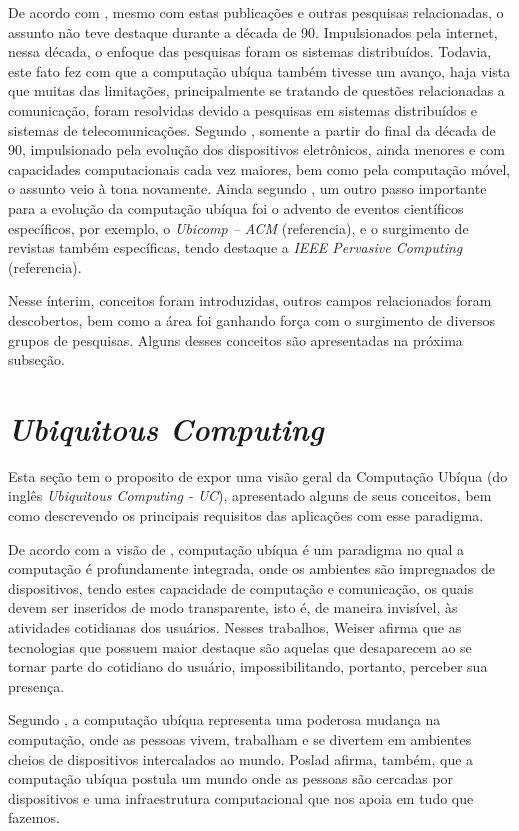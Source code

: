 De acordo com \cite{campiolo2005}, mesmo com estas publicações e outras pesquisas relacionadas, o assunto não teve destaque durante a década de 90. Impulsionados pela internet, nessa década, o enfoque das pesquisas foram os sistemas distribuídos. Todavia, este fato fez com que a computação ubíqua também tivesse um avanço, haja vista que muitas das limitações, principalmente se tratando de questões relacionadas a comunicação, foram resolvidas devido a pesquisas em sistemas distribuídos e sistemas de telecomunicações. Segundo \cite{campiolo2005}, somente a partir do final da década de 90, impulsionado pela evolução dos dispositivos eletrônicos, ainda menores e com capacidades computacionais cada vez maiores, bem como pela computação móvel, o assunto veio à tona novamente.  Ainda segundo \cite{campiolo2005}, um outro passo importante para a evolução da computação ubíqua foi o advento de eventos científicos específicos, por exemplo, o \textit{Ubicomp – ACM} (referencia), e o surgimento de revistas também específicas, tendo destaque a  \textit{IEEE Pervasive Computing} (referencia).  

Nesse ínterim, conceitos foram introduzidas, outros campos relacionados foram descobertos, bem como a área foi ganhando força com o surgimento de diversos grupos de pesquisas. Alguns desses conceitos são apresentadas na próxima subseção. 


\section{\textit{Ubiquitous Computing}}
\label{sc:definicoes}

Esta seção tem o proposito de expor uma visão geral da Computação Ubíqua (do inglês \textit{Ubiquitous Computing - UC}), apresentado alguns de seus conceitos, bem como descrevendo os principais requisitos das aplicações com esse paradigma.

De acordo com a visão de \cite{weiser1991,weiser1993},  computação ubíqua é um paradigma no qual a computação é profundamente integrada, onde os ambientes são impregnados de dispositivos, tendo estes capacidade de computação e comunicação, os quais devem ser inseridos de modo transparente, isto é, de maneira invisível, às atividades cotidianas dos usuários. Nesses trabalhos,  Weiser afirma que as tecnologias que possuem maior destaque são aquelas que desaparecem ao se tornar parte do cotidiano do usuário, impossibilitando, portanto, perceber sua presença.

Segundo \cite{poslad2009}, a computação ubíqua representa uma poderosa mudança na computação, onde as pessoas vivem, trabalham e se divertem em ambientes cheios de dispositivos intercalados ao mundo. Poslad afirma, também, que a computação ubíqua postula um mundo onde as pessoas são cercadas por dispositivos e uma infraestrutura computacional que nos apoia em tudo que fazemos. 

